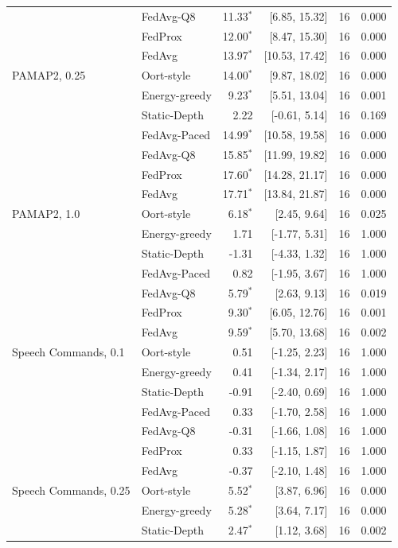 \begin{tabular}{@{}llrrrr@{}}
 & FedAvg-Q8 & 11.33$^{*}$ & [6.85, 15.32] & 16 & 0.000\\
 & FedProx & 12.00$^{*}$ & [8.47, 15.30] & 16 & 0.000\\
 & FedAvg & 13.97$^{*}$ & [10.53, 17.42] & 16 & 0.000\\
\midrule
PAMAP2, 0.25 & Oort-style & 14.00$^{*}$ & [9.87, 18.02] & 16 & 0.000\\
 & Energy-greedy & 9.23$^{*}$ & [5.51, 13.04] & 16 & 0.001\\
 & Static-Depth & 2.22 & [-0.61, 5.14] & 16 & 0.169\\
 & FedAvg-Paced & 14.99$^{*}$ & [10.58, 19.58] & 16 & 0.000\\
 & FedAvg-Q8 & 15.85$^{*}$ & [11.99, 19.82] & 16 & 0.000\\
 & FedProx & 17.60$^{*}$ & [14.28, 21.17] & 16 & 0.000\\
 & FedAvg & 17.71$^{*}$ & [13.84, 21.87] & 16 & 0.000\\
\midrule
PAMAP2, 1.0 & Oort-style & 6.18$^{*}$ & [2.45, 9.64] & 16 & 0.025\\
 & Energy-greedy & 1.71 & [-1.77, 5.31] & 16 & 1.000\\
 & Static-Depth & -1.31 & [-4.33, 1.32] & 16 & 1.000\\
 & FedAvg-Paced & 0.82 & [-1.95, 3.67] & 16 & 1.000\\
 & FedAvg-Q8 & 5.79$^{*}$ & [2.63, 9.13] & 16 & 0.019\\
 & FedProx & 9.30$^{*}$ & [6.05, 12.76] & 16 & 0.001\\
 & FedAvg & 9.59$^{*}$ & [5.70, 13.68] & 16 & 0.002\\
\midrule
Speech Commands, 0.1 & Oort-style & 0.51 & [-1.25, 2.23] & 16 & 1.000\\
 & Energy-greedy & 0.41 & [-1.34, 2.17] & 16 & 1.000\\
 & Static-Depth & -0.91 & [-2.40, 0.69] & 16 & 1.000\\
 & FedAvg-Paced & 0.33 & [-1.70, 2.58] & 16 & 1.000\\
 & FedAvg-Q8 & -0.31 & [-1.66, 1.08] & 16 & 1.000\\
 & FedProx & 0.33 & [-1.15, 1.87] & 16 & 1.000\\
 & FedAvg & -0.37 & [-2.10, 1.48] & 16 & 1.000\\
\midrule
Speech Commands, 0.25 & Oort-style & 5.52$^{*}$ & [3.87, 6.96] & 16 & 0.000\\
 & Energy-greedy & 5.28$^{*}$ & [3.64, 7.17] & 16 & 0.000\\
 & Static-Depth & 2.47$^{*}$ & [1.12, 3.68] & 16 & 0.002\\

\end{tabular}
